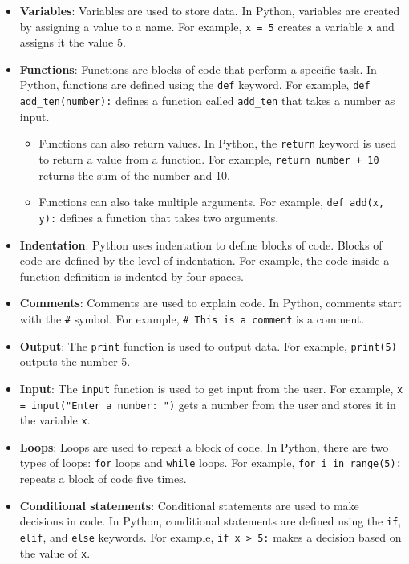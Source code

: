 \begin{itemize}
    \item \textbf{Variables}: Variables are used to store data. In Python, variables are created by assigning a value to a name. For example, \texttt{x = 5} creates a variable \texttt{x} and assigns it the value 5.
    \item \textbf{Functions}: Functions are blocks of code that perform a specific task. In Python, functions are defined using the \texttt{def} keyword. For example, \texttt{def add\_ten(number):} defines a function called \texttt{add\_ten} that takes a number as input.
        \begin{itemize}
            \item Functions can also return values. In Python, the \texttt{return} keyword is used to return a value from a function. For example, \texttt{return number + 10} returns the sum of the number and 10.
            \item Functions can also take multiple arguments. For example, \texttt{def add(x, y):} defines a function that takes two arguments.
        \end{itemize}
    \item \textbf{Indentation}: Python uses indentation to define blocks of code. Blocks of code are defined by the level of indentation. For example, the code inside a function definition is indented by four spaces.
    \item \textbf{Comments}: Comments are used to explain code. In Python, comments start with the \texttt{\#} symbol. For example, \texttt{\# This is a comment} is a comment.
    \item \textbf{Output}: The \texttt{print} function is used to output data. For example, \texttt{print(5)} outputs the number 5.
    \item \textbf{Input}: The \texttt{input} function is used to get input from the user. For example, \texttt{x = input("Enter a number: ")} gets a number from the user and stores it in the variable \texttt{x}.
    \item \textbf{Loops}: Loops are used to repeat a block of code. In Python, there are two types of loops: \texttt{for} loops and \texttt{while} loops. For example, \texttt{for i in range(5):} repeats a block of code five times.
    \item \textbf{Conditional statements}: Conditional statements are used to make decisions in code. In Python, conditional statements are defined using the \texttt{if}, \texttt{elif}, and \texttt{else} keywords. For example, \texttt{if x > 5:} makes a decision based on the value of \texttt{x}.

\end{itemize}
